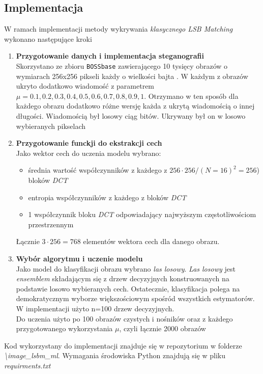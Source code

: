    \subsection{Implementacja}
        W ramach implementacji metody wykrywania \textit{klasycznego LSB Matching} wykonano następujące kroki
        \begin{enumerate}
            \item \textbf{Przygotowanie danych i implementacja steganografii}\\
            Skorzystano ze zbioru \texttt{BOSSbase} zawierającego 10 tysięcy obrazów o wymiarach 256x256 pikseli każdy o wielkości bajta \cite{bossbase}. W każdym z obrazów ukryto dodatkowo wiadomość z parametrem $\mu = 0.1, 0.2, 0.3, 0.4, 0.5, 0.6, 0.7, 0.8, 0.9, 1$. Otrzymano w ten sposób dla każdego obrazu dodatkowo różne wersję każda z ukrytą wiadomością o innej długości. Wiadomością był losowy ciąg bitów. Ukrywany był on w losowo wybieranych pikselach
            \item \textbf{Przygotowanie funckji do ekstrakcji cech}\\
            Jako wektor cech do uczenia modelu wybrano:
            \begin{itemize}
                \item średnia wartość współczynników z każdego z $256\cdot256 / (N=16)^2 = 256$) bloków \textit{DCT}
                \item entropia współczynników z każdego z bloków \textit{DCT}
                \item 1 współczynnik bloku \textit{DCT} odpowiadający najwyższym częstotliwościom przestrzennym
            \end{itemize}
            Łącznie $3\cdot256=768$ elementów wektora cech dla danego obrazu.
            \item \textbf{Wybór algorytmu i uczenie modelu}\\
            Jako model do klasyfikacji obrazu wybrano \textit{las losowy}. \textit{Las losowy} jest \textit{ensemblem} składającym się z drzew decyzyjnych konstruowanych na podstawie losowo wybieranych cech. Ostatecznie, klasyfikacja polega na demokratycznym wyborze większościowym spośród wszystkich estymatorów. W implementacji użyto n=100 drzew decyzyjnych.\cite{random_forest}\\
            Do uczenia użyto po 100 obrazów czystych i nośników oraz z każdego przygotowanego wykorzystania $\mu$, czyli łącznie 2000 obrazów
        \end{enumerate}
        Kod wykorzystany do implementacji znajduje się w repozytorium w folderze \textit{\textbackslash image\_lsbm\_ml}. Wymagania środowiska Python znajdują się w pliku \textit{requirments.txt}
        
